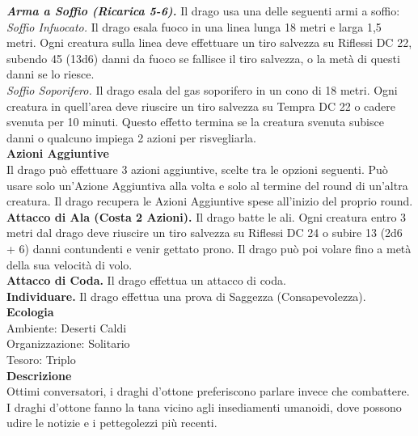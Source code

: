 \begin{multicols}{2}
\emph{\textbf{Arma a Soffio (Ricarica 5-6).}} Il drago usa una delle seguenti armi a soffio:\\
\emph{Soffio Infuocato.} Il drago esala fuoco in una linea lunga 18 metri e larga 1,5 metri. Ogni creatura sulla linea deve effettuare un tiro salvezza su Riflessi DC  22, subendo 45 (13d6) danni da fuoco se fallisce il tiro salvezza, o la metà di questi danni se lo riesce.\\
\emph{Soffio Soporifero.} Il drago esala del gas soporifero in un cono di 18 metri. Ogni creatura in quell'area deve riuscire un tiro salvezza su Tempra DC  22 o cadere svenuta per 10 minuti. Questo effetto termina se la creatura svenuta subisce danni o qualcuno impiega 2 azioni per risvegliarla.\\
\textbf{Azioni Aggiuntive}\\
Il drago può effettuare 3 azioni aggiuntive, scelte tra le opzioni seguenti. Può usare solo un'Azione Aggiuntiva alla volta e solo al termine del round di un'altra creatura. Il drago recupera le Azioni Aggiuntive spese all'inizio del proprio round.\\
\textbf{Attacco di Ala (Costa 2 Azioni).} Il drago batte le ali. Ogni creatura entro 3 metri dal drago deve riuscire un tiro salvezza su Riflessi DC  24 o subire 13 (2d6 + 6) danni contundenti e venir gettato prono. Il drago può poi volare fino a metà della sua velocità di volo.\\
\textbf{Attacco di Coda.} Il drago effettua un attacco di coda.\\
\textbf{Individuare.} Il drago effettua una prova di Saggezza (Consapevolezza).\\
\textbf{Ecologia}\\
Ambiente: Deserti Caldi\\
Organizzazione: Solitario\\
Tesoro: Triplo\\
\textbf{Descrizione}\\
Ottimi conversatori, i draghi d'ottone preferiscono parlare invece che combattere. I draghi d'ottone fanno la tana vicino agli insediamenti umanoidi, dove possono udire le notizie e i pettegolezzi più recenti.\\



\end{multicols}

